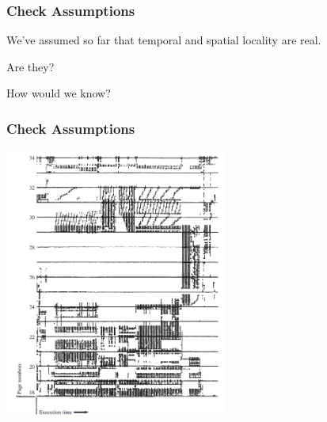 \begin{frame}
\frametitle{Check Assumptions}

We've assumed so far that temporal and spatial locality are real.

Are they? 

How would we know?

\end{frame}

\begin{frame}
\frametitle{Check Assumptions}

\begin{center}
\includegraphics[width=0.55\textwidth]{images/locality.png}
\end{center}


\end{frame}






